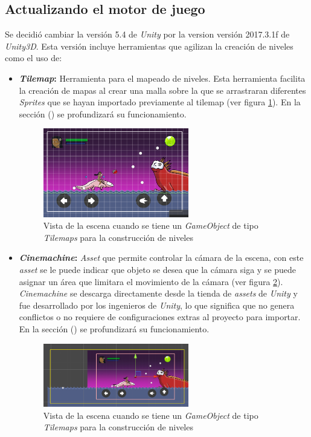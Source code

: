 \subsection{Actualizando el motor de juego}
Se decidió cambiar la versión 5.4 de \textit{Unity} por la version versión 
2017.3.1f de \textit{Unity3D}. Esta versión incluye herramientas que agilizan la 
creación de niveles como el uso de: 
	\begin{itemize}
		\item \textbf{\textit{Tilemap}:} Herramienta para el mapeado de niveles. Esta 
		herramienta facilita la creación de mapas al crear una malla sobre la que 
		se arrastraran diferentes \textit{Sprites} que se hayan importado previamente 
		al tilemap (ver figura \ref{fig:TilemapPantalla}). En la sección () se 
		profundizará su funcionamiento.
		
		\begin{figure}[h]
    			\centering
    			\includegraphics[width=0.6\textwidth]{02Antecedentes/Imagenes/tilemaps01.png}
    			\caption{Vista de la escena cuando se tiene un \textit{GameObject} de 
    			tipo \textit{Tilemaps} para la construcción de niveles}
    			\label{fig:TilemapPantalla}
		\end{figure}
		
		\item \textbf{\textit{Cinemachine}:} \textit{Asset} que permite controlar la 
		cámara de la escena, con este \textit{asset} se le puede indicar que objeto se 
		desea que la cámara siga y se puede asignar un área que limitara el movimiento 
		de la cámara (ver figura \ref{fig:CinemaPantalla}). \textit{Cinemachine} se 
		descarga directamente desde la tienda de \textit{assets} de \textit{Unity} y 
		fue desarrollado por los ingenieros de \textit{Unity}, lo que significa que 
		no genera conflictos o no requiere de configuraciones extras al proyecto para 
		importar. En la sección () se profundizará su funcionamiento.
			
			\begin{figure}[h]
    			\centering
    			\includegraphics[width=0.6\textwidth]{02Antecedentes/Imagenes/cinemachine01.png}
    			\caption{Vista de la escena cuando se tiene un \textit{GameObject} de 
    			tipo \textit{Tilemaps} para la construcción de niveles}
    			\label{fig:CinemaPantalla}
			\end{figure}


\end{itemize}
